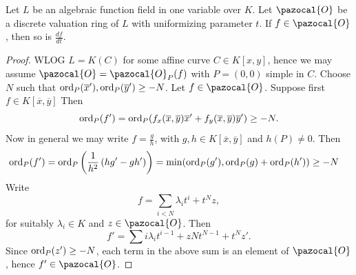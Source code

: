     \begin{proposition}
        Let $L$ be an algebraic function field in one variable over $K$. Let $\pazocal{O}$ be a discrete valuation ring of $L$ with uniformizing parameter $t$. If $f\in\pazocal{O}$, then so is $\frac{df}{dt}$.
    \end{proposition}
    \begin{proof}
        WLOG $L=K(C)$ for some affine curve $C\in K[x,y]$, hence we may assume $\pazocal{O}=\pazocal{O}_P(f)$ with $P=(0,0)$ simple in $C$. Choose $N$ such that $\mathrm{ord}_P(\overline{x}'),\mathrm{ord}_P(\overline{y}')\geq -N$. Let $f\in \pazocal{O}$. Suppose first $f\in K[\overline{x},\overline{y}]$ Then 
        $$
            \mathrm{ord}_P(f') = \mathrm{ord}_P(f_x(\overline{x},\overline{y})\overline{x}' + f_y(\overline{x},\overline{y})\overline{y}')\geq -N.
        $$ 
        Now in general we may write $f = \frac{g}{h}$, with $g,h\in K[\overline{x},\overline{y}]$ and $h(P)\neq 0$. Then 
        \begin{align*}
            \mathrm{ord}_P(f') &= \mathrm{ord}_P\left(\frac{1}{h^2}\left(hg'-gh'\right)\right) = \min(\mathrm{ord}_P(g'),\mathrm{ord}_P(g)+\mathrm{ord}_P(h')) \geq -N
        \end{align*}
        Write 
        $$
            f = \sum_{i<N}\lambda_it^i + t^Nz,
        $$
        for suitably $\lambda_i\in K$ and $z\in \pazocal{O}$. Then 
        $$
            f' = \sum i\lambda_it^{i-1}+zNt^{N-1}+t^Nz'.
        $$
        Since $\mathrm{ord}_P(z')\geq -N$, each term in the above sum is an element of $\pazocal{O}$, hence $f'\in \pazocal{O}$.
    \end{proof}
